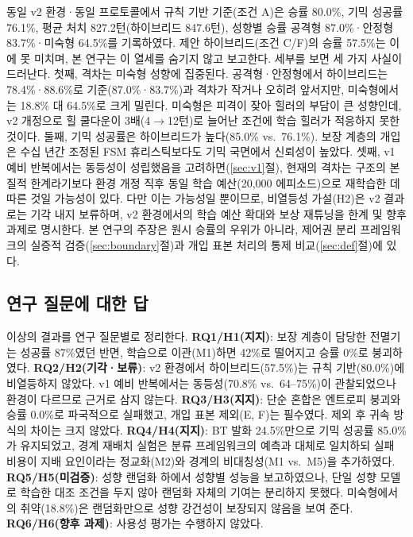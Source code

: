 \documentclass[12pt]{article}      %
\begin{document}
동일 v2 환경·동일 프로토콜에서 규칙 기반 기준(조건 A)은 승률 80.0\%, 기믹 성공률
76.1\%, 평균 처치 827.2턴(하이브리드 847.6턴), 성향별 승률 공격형 87.0\%·안정형
83.7\%·미숙형 64.5\%를 기록하였다. 제안 하이브리드(조건 C/F)의 승률 57.5\%는
이에 못 미치며, 본 연구는 이 열세를 숨기지 않고 보고한다. 세부를 보면 세 가지
사실이 드러난다. 첫째, 격차는 미숙형 성향에 집중된다. 공격형·안정형에서
하이브리드는 78.4\%·88.6\%로 기준(87.0\%·83.7\%)과 격차가 작거나 오히려
앞서지만, 미숙형에서는 18.8\% 대 64.5\%로 크게 밀린다. 미숙형은 피격이 잦아
힐러의 부담이 큰 성향인데, v2 개정으로 힐 쿨다운이 3배(4$\rightarrow$12턴)로
늘어난 조건에 학습 힐러가 적응하지 못한 것이다. 둘째, 기믹 성공률은 하이브리드가
높다(85.0\% vs.\ 76.1\%). 보장 계층의 개입은 수십 년간 조정된 FSM 휴리스틱보다도
기믹 국면에서 신뢰성이 높았다. 셋째, v1 예비 반복에서는 동등성이 성립했음을
고려하면(\ref{sec:v1}절), 현재의 격차는 구조의 본질적 한계라기보다 환경 개정
직후 동일 학습 예산(20{,}000 에피소드)으로 재학습한 데 따른 것일 가능성이 있다.
다만 이는 가능성일 뿐이므로, 비열등성 가설(H2)은 v2 결과로는 기각 내지
보류하며, v2 환경에서의 학습 예산 확대와 보상 재튜닝을 한계 및 향후 과제로
명시한다. 본 연구의 주장은 원시 승률의 우위가 아니라, 제어권 분리 프레임워크의
실증적 검증(\ref{sec:boundary}절)과 개입 표본 처리의 통제
비교(\ref{sec:def}절)에 있다.

\subsection{연구 질문에 대한 답}

이상의 결과를 연구 질문별로 정리한다. \textbf{RQ1/H1(지지)}: 보장 계층이 담당한
전멸기는 성공률 87\%였던 반면, 학습으로 이관(M1)하면 42\%로 떨어지고 승률 0\%로
붕괴하였다. \textbf{RQ2/H2(기각·보류)}: v2 환경에서 하이브리드(57.5\%)는 규칙
기반(80.0\%)에 비열등하지 않았다. v1 예비 반복에서는 동등성(70.8\% vs.\
64--75\%)이 관찰되었으나 환경이 다르므로 근거로 삼지 않는다.
\textbf{RQ3/H3(지지)}: 단순 혼합은 엔트로피 붕괴와 승률 0.0\%로 파국적으로
실패했고, 개입 표본 제외(E, F)는 필수였다. 제외 후 귀속 방식의 차이는 크지
않았다. \textbf{RQ4/H4(지지)}: BT 발화 24.5\%만으로 기믹 성공률 85.0\%가
유지되었고, 경계 재배치 실험은 분류 프레임워크의 예측과 대체로 일치하되 실패
비용이 지배 요인이라는 정교화(M2)와 경계의 비대칭성(M1 vs.\ M5)을 추가하였다.
\textbf{RQ5/H5(미검증)}: 성향 랜덤화 하에서 성향별 성능을 보고하였으나, 단일
성향 모델로 학습한 대조 조건을 두지 않아 랜덤화 자체의 기여는 분리하지 못했다.
미숙형에서의 취약(18.8\%)은 랜덤화만으로 성향 강건성이 보장되지 않음을 보여
준다. \textbf{RQ6/H6(향후 과제)}: 사용성 평가는 수행하지 않았다.
\end{document}
